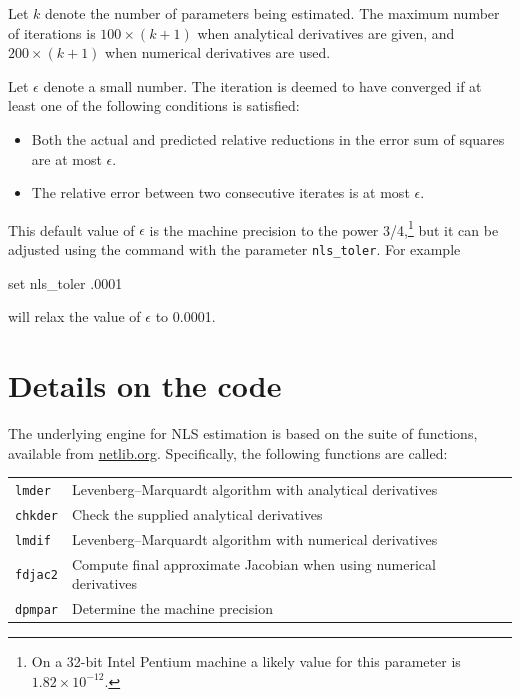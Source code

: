 Let $k$ denote the number of parameters being estimated.  The maximum
number of iterations is $100 \times (k+1)$ when analytical derivatives
are given, and $200 \times (k+1)$ when numerical derivatives are used.

Let $\epsilon$ denote a small number.  The iteration is deemed to have
converged if at least one of the following conditions is satisfied:

\begin{itemize}
\item Both the actual and predicted relative reductions in the error
  sum of squares are at most $\epsilon$.
\item The relative error between two consecutive iterates is at most
  $\epsilon$.
\end{itemize}

This default value of $\epsilon$ is the machine precision to the power
3/4,\footnote{On a 32-bit Intel Pentium machine a likely value for
  this parameter is $1.82\times 10^{-12}$.} but it can be adjusted
using the  command with the parameter \verb+nls_toler+.  For
example
%
\begin{code}
set nls_toler .0001
\end{code}
% 
will relax the value of $\epsilon$ to 0.0001.

\section{Details on the code}
\label{nls-code}

The underlying engine for NLS estimation is based on the 
suite of functions, available from
\href{http://www.netlib.org/minpack/}{netlib.org}.  Specifically, the
following  functions are called:

\begin{center}
  \begin{tabular}{ll}
    \verb+lmder+ & Levenberg--Marquardt algorithm with analytical
    derivatives
    \\
    \verb+chkder+ & Check the supplied analytical derivatives
    \\
    \verb+lmdif+ & Levenberg--Marquardt algorithm with numerical
    derivatives
    \\
    \verb+fdjac2+ & Compute final approximate Jacobian when using
    numerical derivatives
    \\
    \verb+dpmpar+ & Determine the machine precision
    \\
  \end{tabular}
\end{center}


